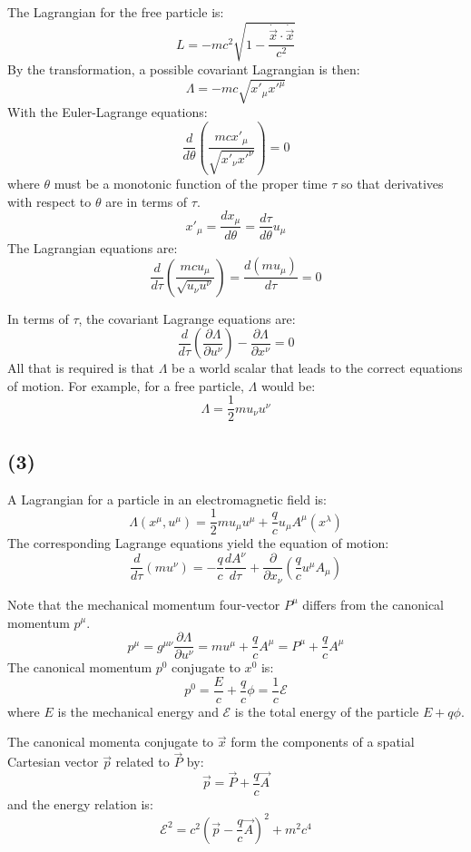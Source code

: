 \documentclass{article}
\begin{document}
    The Lagrangian for the free particle is:
    $$ L = -mc^2 \sqrt{1 - \frac{\dot{\vec{x}} \cdot \dot{\vec{x}}}{c^2}} $$
    By the transformation, a possible covariant Lagrangian is then:
    $$ \Lambda = -mc\sqrt{x'_\mu x'^\mu} $$
    With the Euler-Lagrange equations:
    $$ \frac{d}{d\theta} \left( \frac{mc x'_\mu}{\sqrt{x'_\nu x'^\nu}} \right) = 0 $$
    where $\theta$ must be a monotonic function of the proper time $\tau$ so that derivatives with respect to $\theta$ are in terms of $\tau$.
    $$ x'_\mu = \frac{dx_\mu}{d\theta} = \frac{d\tau}{d\theta} u_\mu $$
    The Lagrangian equations are:
    $$ \frac{d}{d\tau} \left( \frac{m c u_\mu}{\sqrt{u_\nu u^\nu}} \right) = \frac{d(mu_\mu)}{d\tau} = 0 $$
    
    In terms of $\tau$, the covariant Lagrange equations are:
    $$ \frac{d}{d\tau} \left(\frac{\partial \Lambda}{\partial u^\nu}\right) - \frac{\partial \Lambda}{\partial x^\nu} = 0 $$
    All that is required is that $\Lambda$ be a world scalar that leads to the correct equations of motion. For example, for a free particle, $\Lambda$ would be:
    $$ \Lambda = \frac{1}{2} m u_\nu u^\nu $$
    
    \subsection*{(3)}
    A Lagrangian for a particle in an electromagnetic field is:
    $$ \Lambda(x^\mu, u^\mu) = \frac{1}{2} m u_\mu u^\mu + \frac{q}{c} u_\mu A^\mu(x^\lambda) $$
    The corresponding Lagrange equations yield the equation of motion:
    $$ \frac{d}{d\tau}(m u^\nu) = -\frac{q}{c}\frac{dA^\nu}{d\tau} + \frac{\partial}{\partial x_\nu} \left(\frac{q}{c} u^\mu A_\mu\right) $$
    
    Note that the mechanical momentum four-vector $P^\mu$ differs from the canonical momentum $p^\mu$.
    $$ p^\mu = g^{\mu\nu} \frac{\partial \Lambda}{\partial u^\nu} = m u^\mu + \frac{q}{c} A^\mu = P^\mu + \frac{q}{c} A^\mu $$
    The canonical momentum $p^0$ conjugate to $x^0$ is:
    $$ p^0 = \frac{E}{c} + \frac{q}{c}\phi = \frac{1}{c} \mathcal{E} $$
    where $E$ is the mechanical energy and $\mathcal{E}$ is the total energy of the particle $E+q\phi$.
    
    The canonical momenta conjugate to $\vec{x}$ form the components of a spatial Cartesian vector $\vec{p}$ related to $\vec{P}$ by:
    $$ \vec{p} = \vec{P} + \frac{q}{c}\vec{A} $$
    and the energy relation is:
    $$ \mathcal{E}^2 = c^2\left(\vec{p} - \frac{q}{c}\vec{A}\right)^2 + m^2c^4 $$
    
\end{document}
